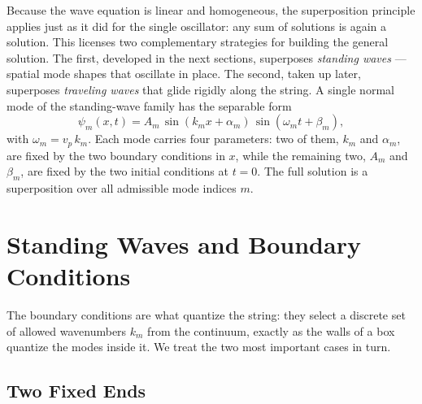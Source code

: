Because the wave equation is linear and homogeneous, the superposition principle applies just as it did for the single oscillator: any sum of solutions is again a solution. This licenses two complementary strategies for building the general solution. The first, developed in the next sections, superposes \emph{standing waves} --- spatial mode shapes that oscillate in place. The second, taken up later, superposes \emph{traveling waves} that glide rigidly along the string. A single normal mode of the standing-wave family has the separable form
\begin{equation}
    \psi_m(x,t) = A_m\,\sin(k_m x + \alpha_m)\,\sin(\omega_m t + \beta_m),
    \label{eq:normalmode}
\end{equation}
with $\omega_m = v_p\,k_m$. Each mode carries four parameters: two of them, $k_m$ and $\alpha_m$, are fixed by the two boundary conditions in $x$, while the remaining two, $A_m$ and $\beta_m$, are fixed by the two initial conditions at $t=0$. The full solution is a superposition over all admissible mode indices $m$.

\section{Standing Waves and Boundary Conditions}

The boundary conditions are what quantize the string: they select a discrete set of allowed wavenumbers $k_m$ from the continuum, exactly as the walls of a box quantize the modes inside it. We treat the two most important cases in turn.

\subsection{Two Fixed Ends}

